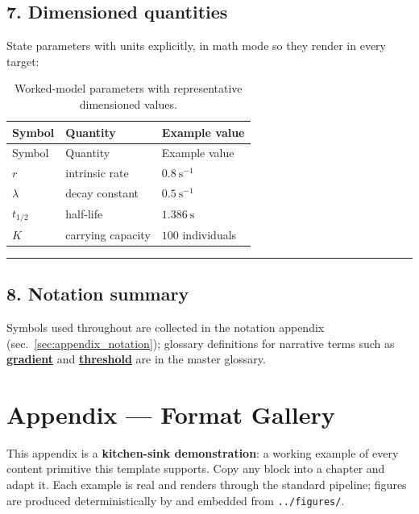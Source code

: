 \documentclass[
]{article}
\theoremstyle{plain}
\theoremstyle{definition}
\begin{document}
\subsection{7. Dimensioned quantities}\label{dimensioned-quantities}

State parameters with units explicitly, in math mode so they render in
every target:

\begin{longtable}[]{@{}lll@{}}
\caption{Worked-model parameters with representative dimensioned
values.}\label{tbl:formalisms_units}\tabularnewline
\toprule\noalign{}
Symbol & Quantity & Example value \\
\midrule\noalign{}
\endfirsthead
\toprule\noalign{}
Symbol & Quantity & Example value \\
\midrule\noalign{}
\endhead
\bottomrule\noalign{}
\endlastfoot
\(r\) & intrinsic rate & \(0.8\ \mathrm{s^{-1}}\) \\
\(\lambda\) & decay constant & \(0.5\ \mathrm{s^{-1}}\) \\
\(t_{1/2}\) & half-life & \(1.386\ \mathrm{s}\) \\
\(K\) & carrying capacity & \(100\) individuals \\
\end{longtable}

\begin{center}\rule{0.5\linewidth}{0.5pt}\end{center}

\subsection{8. Notation summary}\label{notation-summary}

Symbols used throughout are collected in the notation appendix
(sec.~\ref{sec:appendix_notation}); glossary definitions for narrative
terms such as \hyperref[gl:gradient]{\textbf{gradient}} and
\hyperref[gl:threshold]{\textbf{threshold}} are in the master glossary.

\newpage

\section{Appendix --- Format Gallery}\label{sec:appendix_format_gallery}

This appendix is a \textbf{kitchen-sink demonstration}: a working
example of every content primitive this template supports. Copy any
block into a chapter and adapt it. Each example is real and renders
through the standard pipeline; figures are produced deterministically by
 and embedded from \texttt{../figures/}.
\end{document}
